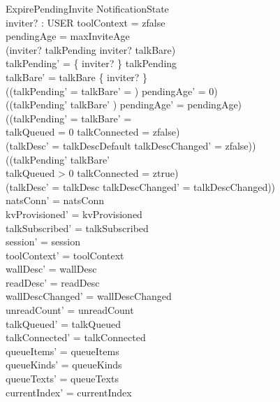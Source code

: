 \documentclass[a4paper,10pt,fleqn]{article}
\begin{document}
\begin{schema}{ExpirePendingInvite}
  \Delta NotificationState \\
  inviter? : USER
  \where
  toolContext = zfalse \\
  pendingAge = maxInviteAge \\
  (inviter? \in \dom talkPending \lor inviter? \in talkBare) \\
  talkPending' = \{ inviter? \} \ndres talkPending \\
  talkBare' = talkBare \setminus \{ inviter? \} \\
  ((\dom talkPending' = \emptyset \land talkBare' = \emptyset) \implies
  pendingAge' = 0) \\
  ((\dom talkPending' \neq \emptyset \lor talkBare' \neq \emptyset) \implies
  pendingAge' = pendingAge) \\
  ((\dom talkPending' = \emptyset \land talkBare' = \emptyset \land \\
  \quad talkQueued = 0 \land talkConnected = zfalse) \implies \\
  \quad (talkDesc' = talkDescDefault \land talkDescChanged' = zfalse)) \\
  ((\dom talkPending' \neq \emptyset \lor talkBare' \neq \emptyset \lor \\
  \quad talkQueued > 0 \lor talkConnected = ztrue) \implies \\
  \quad (talkDesc' = talkDesc \land talkDescChanged' = talkDescChanged)) \\
  natsConn' = natsConn \\
  kvProvisioned' = kvProvisioned \\
  talkSubscribed' = talkSubscribed \\
  session' = session \\
  toolContext' = toolContext \\
  wallDesc' = wallDesc \\
  readDesc' = readDesc \\
  wallDescChanged' = wallDescChanged \\
  unreadCount' = unreadCount \\
  talkQueued' = talkQueued \\
  talkConnected' = talkConnected \\
  queueItems' = queueItems \\
  queueKinds' = queueKinds \\
  queueTexts' = queueTexts \\
  currentIndex' = currentIndex \\

\end{schema}
\end{document}
